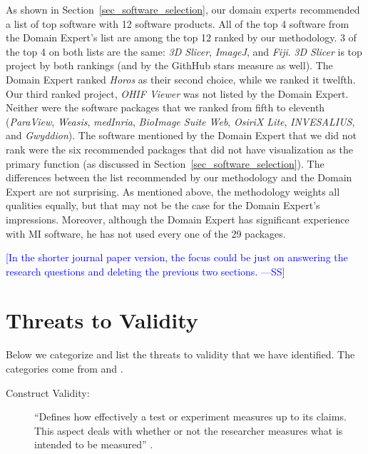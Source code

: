 \documentclass[final, 3p, times, authoryear]{elsarticle}
\newcommand{\authornote}[3]{\textcolor{#1}{[#3 ---#2]}}
\newcommand{\authornote}[3]{}
\newcommand{\wss}[1]{\authornote{blue}{SS}{#1}} %
\begin{document}
As shown in Section~\ref{sec_software_selection}, our domain experts recommended
a list of top software with 12 software products.  All of the top 4 software
from the Domain Expert's list are among the top 12 ranked by our methodology. 3
of the top 4 on both lists are the same: \textit{3D Slicer}, \textit{ImageJ},
and \textit{Fiji}. \textit{3D Slicer} is top project by both rankings (and by
the GithHub stars measure as well).  The Domain Expert ranked \textit{Horos} as
their second choice, while we ranked it twelfth.  Our third ranked project,
\textit{OHIF Viewer} was not listed by the Domain Expert.  Neither were the
software packages that we ranked from fifth to eleventh (\textit{ParaView},
\textit{Weasis}, \textit{medInria}, \textit{BioImage Suite Web}, \textit{OsiriX
Lite}, \textit{INVESALIUS}, and \textit{Gwyddion}).  The software mentioned by
the Domain Expert that we did not rank were the six recommended packages that
did not have visualization as the primary function (as discussed in
Section~\ref{sec_software_selection}).  The differences between the list
recommended by our methodology and the Domain Expert are not surprising.  As
mentioned above, the methodology weights all qualities equally, but that may not
be the case for the Domain Expert's impressions.  Moreover, although the Domain
Expert has significant experience with MI software, he has not used every one of
the 29 packages.

\wss{In the shorter journal paper version, the focus could be just on answering the 
research questions and deleting the previous two sections.}

\section{Threats to Validity} \label{sec_threats_to_validity}

Below we categorize and list the threats to validity that we have identified.
The categories come from \citet{AmpatzoglouEtAl2019} and \citet{ZhouEtAl2016}.

\begin{description}
    \item[Construct Validity:] ``Defines how effectively a test or experiment measures
    up to its claims. This aspect deals with whether or not the researcher measures
    what is intended to be measured'' \citep{AmpatzoglouEtAl2019}.
\end{description}
\end{document}
